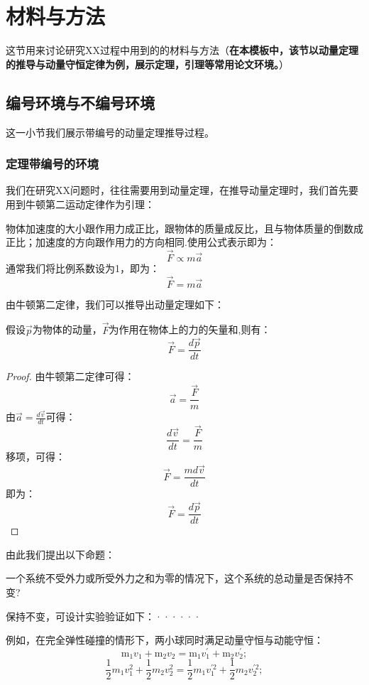 \section{材料与方法}这节用来讨论研究XX过程中用到的的材料与方法（\textbf{在本模板中，该节以动量定理的推导与动量守恒定律为例，展示定理，引理等常用论文环境。}）
 
\subsection{编号环境与不编号环境}
这一小节我们展示带编号的动量定理推导过程。
\subsubsection{定理带编号的环境}

我们在研究XX问题时，往往需要用到动量定理，在推导动量定理时，我们首先要用到牛顿第二运动定律作为引理：
\begin{lemma}[牛顿第二运动定律]\label{lem2_1} 

    物体加速度的大小跟作用力成正比，跟物体的质量成反比，且与物体质量的倒数成正比；加速度的方向跟作用力的方向相同.使用公式表示即为：
    $$ \vec{F}\propto m\vec{a} $$
    通常我们将比例系数设为1，即为：
    $$\vec{F}= m\vec{a}$$
    
\end{lemma}

由牛顿第二定律，我们可以推导出动量定理如下：
\begin{theorem}[动量定理]\label{thm2_2}
    假设$\vec{p}$为物体的动量，$\vec{F}$为作用在物体上的力的矢量和,则有：
    $$\vec{F}=\frac{d\vec{p}}{dt}$$
\end{theorem}

\begin{proof}
	由牛顿第二定律可得：$$ \vec{a}=\frac{\vec{F}}{m}$$
	由$\vec{a}=\frac{d\vec{v}}{dt}$可得：
	$$\frac{d\vec{v}}{dt}=\frac{\vec{F}}{m}$$
	移项，可得：
	$$\vec{F}=\frac{md\vec{v}}{dt}$$
	即为：
	$$\vec{F}=\frac{d\vec{p}}{dt}$$
\end{proof}

由此我们提出以下命题：
\begin{problem}[动量是否守恒]
	一个系统不受外力或所受外力之和为零的情况下，这个系统的总动量是否保持不变?
\end{problem}

\begin{solution}
    保持不变，可设计实验验证如下：······
\end{solution}

\begin{example}[完全弹性碰撞]
	例如，在完全弹性碰撞的情形下，两小球同时满足动量守恒与动能守恒：
	 $$\mathrm{m}_{1} v_{1}+\mathrm{m}_{2} v_{2}=\mathrm{m}_{1} v_{1}^{\prime}+\mathrm{m}_{2} v_{2}^{\prime}; $$
	$$\frac{1}{2} m_{1} v_{1}^{2}+\frac{1}{2} m_{2} v_{2}^{2}=\frac{1}{2} m_{1} v_{1}^{\prime 2}+\frac{1}{2} m_{2} v_{2}^{\prime 2} ;$$
\end{example}

